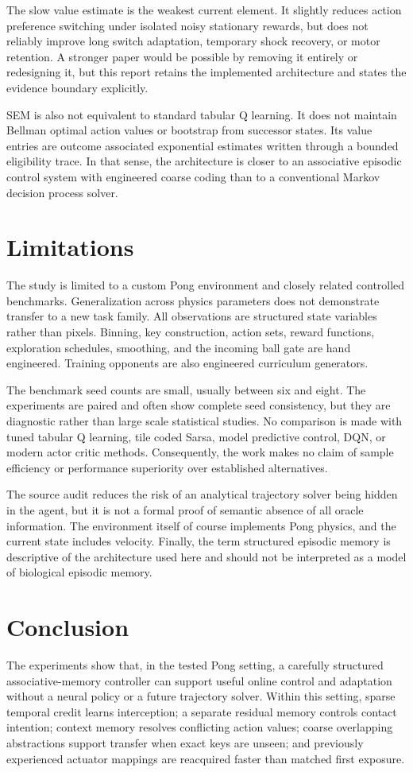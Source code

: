 \documentclass[10pt,twocolumn]{article}
\begin{document}
The slow value estimate is the weakest current element. It slightly reduces action preference switching under isolated noisy stationary rewards, but does not reliably improve long switch adaptation, temporary shock recovery, or motor retention. A stronger paper would be possible by removing it entirely or redesigning it, but this report retains the implemented architecture and states the evidence boundary explicitly.

SEM is also not equivalent to standard tabular Q learning. It does not maintain Bellman optimal action values or bootstrap from successor states. Its value entries are outcome associated exponential estimates written through a bounded eligibility trace. In that sense, the architecture is closer to an associative episodic control system with engineered coarse coding than to a conventional Markov decision process solver.

\section{Limitations}
The study is limited to a custom Pong environment and closely related controlled benchmarks. Generalization across physics parameters does not demonstrate transfer to a new task family. All observations are structured state variables rather than pixels. Binning, key construction, action sets, reward functions, exploration schedules, smoothing, and the incoming ball gate are hand engineered. Training opponents are also engineered curriculum generators.

The benchmark seed counts are small, usually between six and eight. The experiments are paired and often show complete seed consistency, but they are diagnostic rather than large scale statistical studies. No comparison is made with tuned tabular Q learning, tile coded Sarsa, model predictive control, DQN, or modern actor critic methods. Consequently, the work makes no claim of sample efficiency or performance superiority over established alternatives.

The source audit reduces the risk of an analytical trajectory solver being hidden in the agent, but it is not a formal proof of semantic absence of all oracle information. The environment itself of course implements Pong physics, and the current state includes velocity. Finally, the term structured episodic memory is descriptive of the architecture used here and should not be interpreted as a model of biological episodic memory.

\section{Conclusion}
The experiments show that, in the tested Pong setting, a carefully structured associative-memory controller can support useful online control and adaptation without a neural policy or a future trajectory solver. Within this setting, sparse temporal credit learns interception; a separate residual memory controls contact intention; context memory resolves conflicting action values; coarse overlapping abstractions support transfer when exact keys are unseen; and previously experienced actuator mappings are reacquired faster than matched first exposure.
\end{document}
